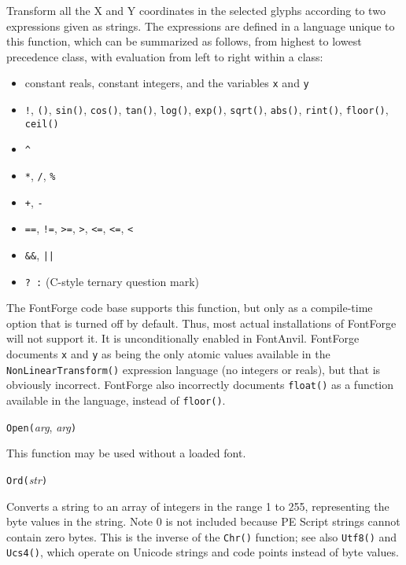 Transform all the X and Y coordinates in the selected glyphs according to
two expressions given as strings.  The expressions are defined in a language
unique to this function, which can be summarized as follows, from highest to
lowest precedence class, with evaluation from left to right within a class:
\begin{itemize}
  \item constant reals, constant integers, and the variables \texttt{x} and
    \texttt{y}
  \item \texttt{!}, \texttt{()}, \texttt{sin()}, \texttt{cos()},
    \texttt{tan()}, \texttt{log()}, \texttt{exp()}, \texttt{sqrt()},
    \texttt{abs()}, \texttt{rint()}, \texttt{floor()},
    \texttt{ceil()}
  \item \texttt{\textasciicircum}
  \item \texttt{*}, \texttt{/}, \texttt{\%}
  \item \texttt{+}, \texttt{-}
  \item \texttt{==}, \texttt{!=}, \texttt{>=}, \texttt{>}, \texttt{<=},
    \texttt{<=}, \texttt{<}
  \item \texttt{\&\&}, \texttt{||}
  \item \texttt{?~:} (C-style ternary question mark)
\end{itemize}

The FontForge \FFdiff code base supports this function, but only as a
compile-time option that is turned off by default.  Thus, most actual
installations of FontForge will not support it.  It is unconditionally
enabled in FontAnvil.  FontForge documents \texttt{x} and \texttt{y} as
being the only atomic values available in the \texttt{NonLinearTransform()}
expression language (no integers or reals), but that is obviously
incorrect.  FontForge also incorrectly documents \texttt{float()} as a
function available in the language, instead of \texttt{floor()}.



\texttt{Open(}\textit{arg}, \textit{arg}\texttt{)}

This function may be used without a loaded font.



\texttt{Ord(}\textit{str}\texttt{)}

Converts a string to an array of integers in the range 1 to 255,
representing the byte values in the string.  Note 0 is not included
because PE Script strings cannot contain zero bytes.
This is the inverse of the \texttt{Chr()}
function; see also \texttt{Utf8()} and \texttt{Ucs4()}, which operate on
Unicode strings and code points instead of byte values.

